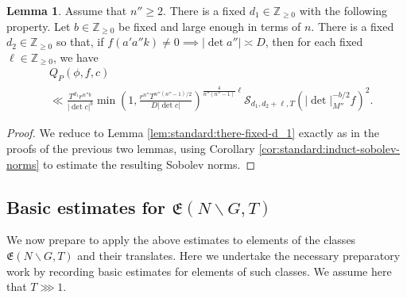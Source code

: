 \documentclass[reqno]{amsart}
\theoremstyle{plain} \newtheorem{theorem} {Theorem}
\theoremstyle{definition} \newtheorem{definition} [theorem] {Definition}
\theoremstyle{itplain} %
\newtheorem{lemma}[theorem]{Lemma}
\numberwithin{equation}{section}
\numberwithin{theorem}{section}
\renewcommand{\geq}{\geqslant}
\begin{document}
\begin{lemma}\label{lem:sub-gln:there-fixed-x-2}
  Assume that $n'' \geq 2$.  There is a fixed $d_1 \in \mathbb{Z}_{\geq 0}$ with the following property.  Let $b \in \mathbb{Z}_{\geq 0}$ be fixed and large enough in terms of $n$.  There is a fixed $d_2 \in \mathbb{Z}_{\geq 0}$ so that, if $f(a ' a'' k) \neq 0 \implies |\det a''| \asymp D$, then for each fixed $\ell \in \mathbb{Z}_{\geq 0}$, we have
  \begin{align*}
    &Q_P(\phi,f,c)
    \\
    &\ll \frac{T^{d_1} r^{n'' b}}{|\det c|^b}
    \min \left( 1,
      \frac{r^{n''} T^{n''(n''-1)/2}}{D |\det c|}
    \right)^{\frac{4}{n''(n''-1)} \ell }
      \mathcal{S}_{d_1, d_2 +\ell, T}\left(|\det|_{M''}^{-b/2} f\right)^2.
  \end{align*}
\end{lemma}
\begin{proof}
  We reduce to Lemma \ref{lem:standard:there-fixed-d_1} exactly as in the proofs of the previous two lemmas, using Corollary \ref{cor:standard:induct-sobolev-norms} to estimate the resulting Sobolev norms.
\end{proof}



\subsection{Basic estimates for $\mathfrak{E}(N \backslash G, T)$}
We now prepare to apply the above estimates to elements of the classes $\mathfrak{E}(N \backslash G, T)$ and their translates.  Here we undertake the necessary preparatory work by recording basic estimates for elements of such classes.  We assume here that $T \ggg 1$.
\end{document}
